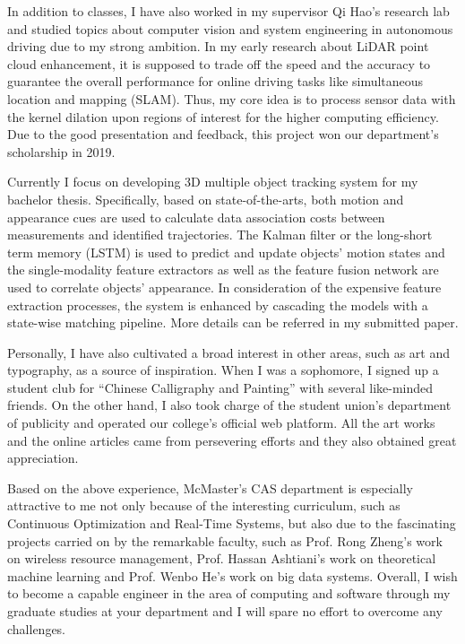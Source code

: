\documentclass{article}
\begin{document}
In addition to classes, I have also worked in my supervisor Qi Hao's research lab and studied topics about computer vision and system engineering in autonomous driving due to my strong ambition. In my early research about LiDAR point cloud enhancement, it is supposed to trade off the speed and the accuracy to guarantee the overall performance for online driving tasks like simultaneous location and mapping (SLAM). Thus, my core idea is to process sensor data with the kernel dilation upon regions of interest for the higher computing efficiency. Due to the good presentation and feedback, this project won our department's scholarship in 2019. 

Currently I focus on developing 3D multiple object tracking system for my bachelor thesis. Specifically, based on state-of-the-arts, both motion and appearance cues are used to calculate data association costs between measurements and identified trajectories. The Kalman filter or the long-short term memory (LSTM) is used to predict and update objects' motion states and the single-modality feature extractors as well as the feature fusion network are used to correlate objects' appearance. In consideration of the expensive feature extraction processes, the system is enhanced by cascading the models with a state-wise matching pipeline. More details can be referred in my submitted paper. 

Personally, I have also cultivated a broad interest in other areas, such as art and typography, as a source of inspiration. When I was a sophomore, I signed up a student club for ``Chinese Calligraphy and Painting'' with several like-minded friends. On the other hand, I also took charge of the student union's department of publicity and operated our college's official web platform. All the art works and the online articles came from persevering efforts and they also obtained great appreciation. 

Based on the above experience, McMaster's CAS department is especially attractive to me not only because of the interesting curriculum, such as Continuous Optimization and Real-Time Systems, but also due to the fascinating projects carried on by the remarkable faculty, such as Prof. Rong Zheng's work on wireless resource management, Prof. Hassan Ashtiani's work on theoretical machine learning and Prof. Wenbo He's work on big data systems. Overall, I wish to become a capable engineer in the area of computing and software through my graduate studies at your department and I will spare no effort to overcome any challenges. 
\end{document}
